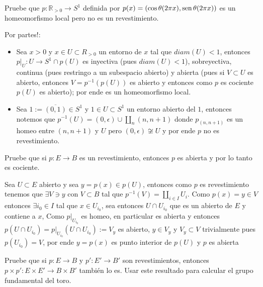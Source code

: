 \documentclass[11pt]{article}
\newcommand{\R}{{\mathbb{R}}}
\newenvironment{proof}[1][Demostraci\'on]{\begin{trivlist}
\item[\hskip \labelsep {\bfseries #1}]}{\end{trivlist}}
\def\sen{{\rm sen} \, \theta}
\def\cos{{\rm cos}\, \theta}
\begin{document}
\begin{enumerate}
\item {Pruebe que $p:\R_{>0}\to S^1$ definida por $p(x)=(\cos (2\pi x), \sen (2\pi x))$ es un homeomorfismo local pero no es un revestimiento.
}

\begin{proof}

Por partes!:

\begin{itemize}

\item Sea  $x >0$ y $x \in U \subset R_{>0}$ un entorno de $x$ tal que $diam(U)<1$, entonces $p|_U : U \rightarrow S^1 \cap p(U)$ es inyectiva (pues $diam(U)<1$), sobreyectiva, continua (pues restringo a un subespacio abierto) y abierta (pues si $V \subset U$ es abierto, entonces $V=p^{-1}(p(U))$ es abierto y entonces como $p$ es cociente $p(U)$ es abierto); por ende es un homeomorfismo local.

\item Sea $1 := \overline{(0,1)} \in S^1$ y $1 \in U \subset S^1$ un entorno abierto del $1$, entonces notemos que $p^{-1}(U) = (0,\epsilon) \cup \coprod_{n}(n,n+1)$ donde $p_{(n,n+1)}$ es un homeo entre $(n,n+1)$ y $U$ pero $(0,\epsilon) \not \cong U$ y por ende $p$ no es revestimiento.

\end{itemize}

\end{proof}

\item {Pruebe que si $p:E\to B$ es un revestimiento, entonces $p$ es abierta y por lo tanto es cociente.
}

\begin{proof}

Sea $U \subset E$ abierto y sea $y=p(x) \in p(U)$, entonces como $p$ es revestimiento tenemos que $\exists V \ni y$ con $V \subset B$ tal que $p^{-1}(V) = \coprod_{i \in I}{U_i}$. Como $p(x)=y \in V$ entonces $\exists i_0 \in I$ tal que $x \in U_{i_0}$, sea entonces $U \cap U_{i_0}$ que es un abierto de $E$ y contiene a $x$, Como $p|_{U_{i_0}}$ es homeo, en particular es abierta y entonces $p(U \cap U_{i_0}) = p|_{U_{i_0}}(U \cap U_{i_0}):=V_y$ es abierto, $y \in V_y$ y $V_y \subset V$ trivialmente pues $p(U_{i_0})=V$, por ende $y=p(x)$ es punto interior de $p(U)$ y $p$ es abierta

\end{proof}

\item {Pruebe que si $p:E\to B$ y $p':E'\to B'$ son revestimientos, entonces $p\times p':E\times E'\to B\times B'$ tambi\'en lo es. Usar este resultado para calcular el grupo fundamental del toro.
}


\end{enumerate}
\end{document}
